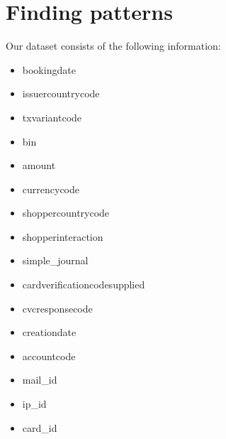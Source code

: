 \section*{Finding patterns}

Our dataset consists of the following information:

\begin{itemize}
	\item bookingdate
	\item issuercountrycode
	\item txvariantcode
	\item bin
	\item amount
	\item currencycode
	\item shoppercountrycode
	\item shopperinteraction
	\item simple\_journal
	\item cardverificationcodesupplied
	\item cvcresponsecode
	\item creationdate
	\item accountcode
	\item mail\_id
	\item ip\_id
	\item card\_id
\end{itemize}